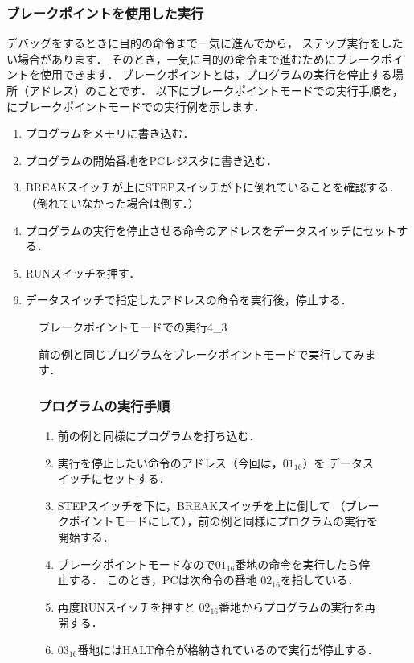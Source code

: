 \subsubsection{ブレークポイントを使用した実行}
デバッグをするときに目的の命令まで一気に進んでから，
ステップ実行をしたい場合があります．
そのとき，一気に目的の命令まで進むためにブレークポイントを使用できます．
ブレークポイントとは，プログラムの実行を停止する場所（アドレス）のことです．
以下にブレークポイントモードでの実行手順を，
にブレークポイントモードでの実行例を示します．

\begin{enumerate}
\item プログラムをメモリに書き込む．
\item プログラムの開始番地をPCレジスタに書き込む．
\item BREAKスイッチが上にSTEPスイッチが下に倒れていることを確認する．\\
  （倒れていなかった場合は倒す．）
\item プログラムの実行を停止させる命令のアドレスをデータスイッチにセットする．
\item RUNスイッチを押す．
\item データスイッチで指定したアドレスの命令を実行後，停止する．
\end{enumerate}

\begin{figure}[tb]
  \begin{rei}{ブレークポイントモードでの実行}{4_3}

    前の例と同じプログラムをブレークポイントモードで実行してみます．

    \subsubsection{プログラムの実行手順}
    \begin{enumerate}
    \item 前の例と同様にプログラムを打ち込む．
    \item 実行を停止したい命令のアドレス（今回は，$01_{16}$）を
      データスイッチにセットする．
    \item STEPスイッチを下に，BREAKスイッチを上に倒して
      （ブレークポイントモードにして），前の例と同様にプログラムの実行を開始する．
    \item ブレークポイントモードなので$01_{16}$番地の命令を実行したら停止する．
      このとき，PCは次命令の番地 $02_{16}$を指している．
    \item 再度RUNスイッチを押すと $02_{16}$番地からプログラムの実行を再開する．
    \item $03_{16}$番地にはHALT命令が格納されているので実行が停止する．
    \end{enumerate}
  \end{rei}
\end{figure}

